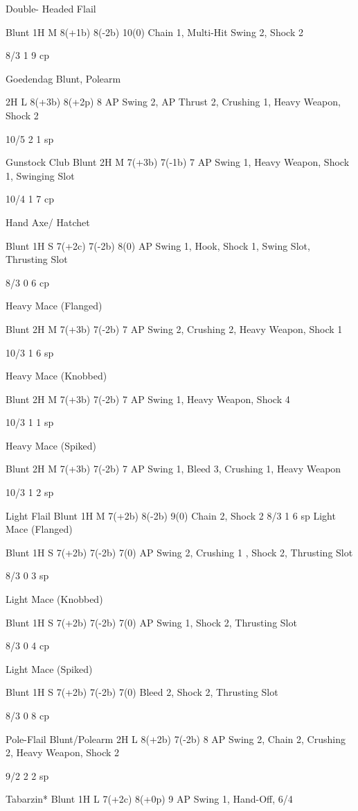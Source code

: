 \documentclass[oneside,11pt,english]{book}
\begin{document}
Double-
Headed Flail 

Blunt 1H M 8(+1b) 8(-2b) 10(0) Chain 1, Multi-Hit 
Swing 2, Shock 2 

8/3 1 9 cp 

Goedendag Blunt, 
Polearm 

2H L 8(+3b) 8(+2p) 8 AP Swing 2, AP Thrust 
2, Crushing 1, Heavy 
Weapon, Shock 2 

10/5 2 1 sp 

Gunstock Club Blunt 2H M 7(+3b) 7(-1b) 7 AP Swing 1, Heavy 
Weapon, Shock 1, 
Swinging Slot 

10/4 1 7 cp 

Hand Axe/ 
Hatchet 

Blunt 1H S 7(+2c) 7(-2b) 8(0) AP Swing 1, Hook, 
Shock 1, Swing Slot, 
Thrusting Slot 

8/3 0 6 cp 

Heavy Mace 
(Flanged) 

Blunt 2H M 7(+3b) 7(-2b) 7 AP Swing 2, Crushing 
2, Heavy Weapon, 
Shock 1 

10/3 1 6 sp 

Heavy Mace 
(Knobbed) 

Blunt 2H M 7(+3b) 7(-2b) 7 AP Swing 1, Heavy 
Weapon, Shock 4 

10/3 1 1 sp 

Heavy Mace 
(Spiked) 

Blunt 2H M 7(+3b) 7(-2b) 7 AP Swing 1, Bleed 3, 
Crushing 1, Heavy 
Weapon 

10/3 1 2 sp 

Light Flail Blunt 1H M 7(+2b) 8(-2b) 9(0) Chain 2, Shock 2 8/3 1 6 sp 
Light Mace 
(Flanged) 

Blunt 1H S 7(+2b) 7(-2b) 7(0) AP Swing 2, Crushing 1 
, Shock 2, Thrusting 
Slot 

8/3 0 3 sp 

Light Mace 
(Knobbed) 

Blunt 1H S 7(+2b) 7(-2b) 7(0) AP Swing 1, Shock 2, 
Thrusting Slot 

8/3 0 4 cp 

Light Mace 
(Spiked) 

Blunt 1H S 7(+2b) 7(-2b) 7(0) Bleed 2, Shock 2, 
Thrusting Slot 

8/3 0 8 cp 

Pole-Flail Blunt/Polearm 2H L 8(+2b) 7(-2b) 8 AP Swing 2, Chain 2, 
Crushing 2, Heavy 
Weapon, Shock 2 

9/2 2 2 sp 

Tabarzin* Blunt 1H L 7(+2c) 8(+0p) 9 AP Swing 1, Hand-Off, 6/4 
\end{document}
